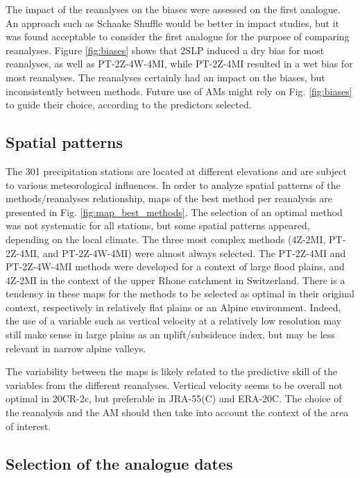 \documentclass{ametsoc}
\begin{document}
The impact of the reanalyses on the biases were assessed on the first analogue. An approach such as Schaake Shuffle \citep{Clark2004a} would be better in impact studies, but it was found acceptable to consider the first analogue for the purpose of comparing reanalyses. Figure \ref{fig:biases} shows that 2SLP induced a dry bias for most reanalyses, as well as PT-2Z-4W-4MI, while PT-2Z-4MI resulted in a wet bias for most reanalyses. The reanalyses certainly had an impact on the biases, but inconsistently between methods. Future use of AMs might rely on Fig. \ref{fig:biases} to guide their choice, according to the predictors selected.


\subsection{Spatial patterns}

The 301 precipitation stations are located at different elevations and are subject to various meteorological influences. In order to analyze spatial patterns of the methods/reanalyses relationship, maps of the best method per reanalysis are presented in Fig. \ref{fig:map_best_methods}. The selection of an optimal method was not systematic for all stations, but some spatial patterns appeared, depending on the local climate. The three most complex methods (4Z-2MI, PT-2Z-4MI, and PT-2Z-4W-4MI) were almost always selected. The PT-2Z-4MI and PT-2Z-4W-4MI methods were developed for a context of large flood plains, and 4Z-2MI in the context of the upper Rhone catchment in Switzerland. There is a tendency in these maps for the methods to be selected as optimal in their original context, respectively in relatively flat plains or an Alpine environment. Indeed, the use of a variable such as vertical velocity at a relatively low resolution may still make sense in large plains as an uplift/subsidence index, but may be less relevant in narrow alpine valleys.

The variability between the maps is likely related to the predictive skill of the variables from the different reanalyses. Vertical velocity seems to be overall not optimal in 20CR-2c, but preferable in JRA-55(C) and ERA-20C. The choice of the reanalysis and the AM should then take into account the context of the area of interest.


\subsection{Selection of the analogue dates}
\end{document}
